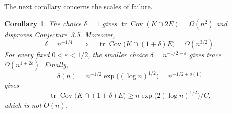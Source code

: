 \documentclass[11pt]{article}
\numberwithin{equation}{section}
\newtheorem{corollary}[corollary]{Corollary}
\theoremstyle{definition}
\begin{document}
The next corollary concerns the scales of failure.

\begin{corollary}
\label{app:counterexample:corollary:scales-of-failure}
The choice $\delta=1$ gives
$\operatorname{tr}\operatorname{Cov}(K\cap2E)=\Omega(n^2)$ and disproves
Conjecture~3.5.
Moreover,
\[
\delta=n^{-1/4}
\quad
\Longrightarrow
\quad
\operatorname{tr}\operatorname{Cov}\bigl(K\cap(1+\delta)E\bigr) =\Omega(n^{3/2}).
\]
For every fixed $0<\varepsilon<1/2$, the smaller choice
$\delta=n^{-1/2+\varepsilon}$ gives trace
$\Omega(n^{1+2\varepsilon})$.
Finally,
\[
\delta(n)
=n^{-1/2}\exp\!\bigl((\log n)^{1/2}\bigr)
=n^{-1/2+o(1)}
\]
gives
\[
  \operatorname{tr}\operatorname{Cov}\bigl(K\cap(1+\delta)E\bigr)
  \geq n\exp\!\bigl(2(\log n)^{1/2}\bigr)/C,
\]
which is not $\widetilde{O}(n)$.
\end{corollary}
\end{document}
